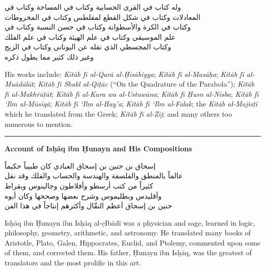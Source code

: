 \documentclass[11pt,a4paper]{article}
\newcommand{\longline}{\noindent\rule{\textwidth}{0.4pt}}
\newcommand{\ar}[1]{{\arabicfont\beginR #1\endR}}
\newcommand{\bilingual}[2]{%
  \noindent
  \begin{minipage}[t]{0.47\textwidth}
    \vspace{0pt}
    \begin{flushright}
    {\arabicfont\beginR #1\endR}
    \end{flushright}
  \end{minipage}%
  \hfill\vline\hfill
  \begin{minipage}[t]{0.47\textwidth}
    \vspace{0pt}
    #2
  \end{minipage}%
  \par\vspace{0.8em}
}
\newcommand{\bilingualsubsection}[2]{%
  \vspace{0.6em}%
  \noindent
  \begin{minipage}[t]{0.47\textwidth}
    \begin{flushright}
    \textbf{\color{sectioncolor}\ar{#1}}
    \end{flushright}
  \end{minipage}%
  \hfill
  \begin{minipage}[t]{0.47\textwidth}
    \textbf{\color{sectioncolor}#2}
  \end{minipage}%
  \par\vspace{0.4em}%
}
\begin{document}
\vspace{0.5em}
\bilingual
{وله كتاب في القرى الحسابية وكتاب في المساحة وكتاب في\\
المعادلات وكتاب في شكل القطع لمقلطس وكتاب في المخروطات\\
وكتاب في الكرة والأسطوانة وكتاب في حسن النسبة وكتاب في\\
علم الموسيقى وكتاب في علم الهيئة وكتاب في علم الفلك\\
وكتاب المجسطي الذي نقله عن اليوناني وكتاب في الزيج\\
وغير ذلك كثير مما يطول ذكره}
{His works include: \textit{Kit\=ab f\=i al-Qar\=a al-\d{H}is\=abiyya};
\textit{Kit\=ab f\=i al-Mas\=a\d{h}a}; \textit{Kit\=ab f\=i
al-Mu\={a}d\=al\=at}; \textit{Kit\=ab f\=i Shakl al-Qi\d{t}\={a}c}
(``On the Quadrature of the Parabola''); \textit{Kit\=ab f\=i
al-Makh\=r\=u\d{t}\=at}; \textit{Kit\=ab f\=i al-Kura wa
al-Ustuw\=ana}; \textit{Kit\=ab f\=i \d{H}usn al-Nisba};
\textit{Kit\=ab f\=i \textquoteleft Ilm al-M\=us\=iq\=a};
\textit{Kit\=ab f\=i \textquoteleft Ilm al-Hay'a}; \textit{Kit\=ab f\=i
\textquoteleft Ilm al-Falak}; the \textit{Kit\=ab al-Majis\d{t}\=i} which he
translated from the Greek; \textit{Kit\=ab f\=i al-Z\=ij}; and many
others too numerous to mention.}

\vspace{1em}
\longline
\vspace{0.5em}

\bilingualsubsection{ذكر إسحاق بن حنين ومصنفاته}{Account of Is\d{h}\=aq ibn \d{H}unayn and His Compositions}

\vspace{0.5em}
\bilingual
{إسحاق بن حنين بن إسحاق العبادي كان طبيباً حكيماً\\
عالماً بالمنطق والفلسفة والهندسة والحساب والفلك وقد نقل\\
كثيراً من كتب أرسطو وأفلاطون وجالينوس وبقراط\\
وأقليدس وبطليموس وشرح بعضها وصححها وكان أبوه\\
حنين بن إسحاق أعظم النقّال وأكثرهم إنتاجاً في هذا الفن}
{Is\d{h}\=aq ibn \d{H}unayn ibn Is\d{h}\=aq al-\d{c}Ib\=ad\=i was a
physician and sage, learned in logic, philosophy, geometry, arithmetic,
and astronomy. He translated many books of Aristotle, Plato, Galen,
Hippocrates, Euclid, and Ptolemy, commented upon some of them, and
corrected them. His father, \d{H}unayn ibn Is\d{h}\=aq, was the greatest
of translators and the most prolific in this art.}
\end{document}
